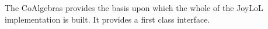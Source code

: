 
\startJoyLoLCoAlg[title=CoAglegras][coAlgs]

\startsection[title=Goals]

The CoAlgebras  provides the basis upon which the whole 
of the JoyLoL implementation is built. It provides a first class 
interface. 





\stopJoyLoLCoAlg
